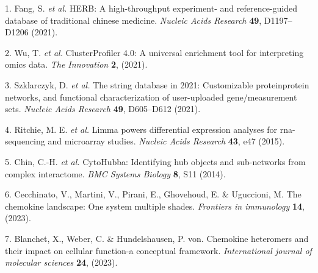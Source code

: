 \documentclass[
]{article}
\newenvironment{cslreferences}%
  {}%
  {\par}
\begin{document}
\hypertarget{refs}{}
\begin{cslreferences}
\leavevmode\hypertarget{ref-HerbAHighThFang2021}{}%
1. Fang, S. \emph{et al.} HERB: A high-throughput experiment- and reference-guided database of traditional chinese medicine. \emph{Nucleic Acids Research} \textbf{49}, D1197--D1206 (2021).

\leavevmode\hypertarget{ref-ClusterprofilerWuTi2021}{}%
2. Wu, T. \emph{et al.} ClusterProfiler 4.0: A universal enrichment tool for interpreting omics data. \emph{The Innovation} \textbf{2}, (2021).

\leavevmode\hypertarget{ref-TheStringDataSzklar2021}{}%
3. Szklarczyk, D. \emph{et al.} The string database in 2021: Customizable proteinprotein networks, and functional characterization of user-uploaded gene/measurement sets. \emph{Nucleic Acids Research} \textbf{49}, D605--D612 (2021).

\leavevmode\hypertarget{ref-LimmaPowersDiRitchi2015}{}%
4. Ritchie, M. E. \emph{et al.} Limma powers differential expression analyses for rna-sequencing and microarray studies. \emph{Nucleic Acids Research} \textbf{43}, e47 (2015).

\leavevmode\hypertarget{ref-CytohubbaIdenChin2014}{}%
5. Chin, C.-H. \emph{et al.} CytoHubba: Identifying hub objects and sub-networks from complex interactome. \emph{BMC Systems Biology} \textbf{8}, S11 (2014).

\leavevmode\hypertarget{ref-TheChemokineLCecchi2023}{}%
6. Cecchinato, V., Martini, V., Pirani, E., Ghovehoud, E. \& Uguccioni, M. The chemokine landscape: One system multiple shades. \emph{Frontiers in immunology} \textbf{14}, (2023).

\leavevmode\hypertarget{ref-ChemokineHeterBlanch2023}{}%
7. Blanchet, X., Weber, C. \& Hundelshausen, P. von. Chemokine heteromers and their impact on cellular function-a conceptual framework. \emph{International journal of molecular sciences} \textbf{24}, (2023).
\end{cslreferences}
\end{document}
